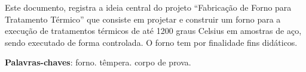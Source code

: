 \begin{resumo}
Este documento, registra a ideia central do projeto “Fabricação de Forno para Tratamento Térmico” que consiste em projetar e construir um forno para a execução de tratamentos térmicos de até 1200 graus Celsius em amostras de aço, sendo executado de forma controlada. O forno tem por finalidade fins didáticos.

 \vspace{\onelineskip}
    
 \noindent
 \textbf{Palavras-chaves}: forno. têmpera. corpo de prova.
\end{resumo}
